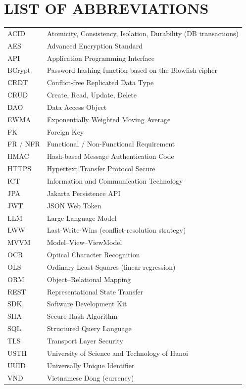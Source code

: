 \documentclass[13pt,a4paper]{extarticle}
\begin{document}
\section*{LIST OF ABBREVIATIONS}
\vspace{0.4cm}
\renewcommand{\arraystretch}{1.25}
\begin{longtable}{@{\hspace{1cm}}p{2.6cm}p{9.5cm}@{}}
ACID     & Atomicity, Consistency, Isolation, Durability (DB transactions) \\
AES      & Advanced Encryption Standard \\
API      & Application Programming Interface \\
BCrypt   & Password-hashing function based on the Blowfish cipher \\
CRDT     & Conflict-free Replicated Data Type \\
CRUD     & Create, Read, Update, Delete \\
DAO      & Data Access Object \\
EWMA     & Exponentially Weighted Moving Average \\
FK       & Foreign Key \\
FR / NFR & Functional / Non-Functional Requirement \\
HMAC     & Hash-based Message Authentication Code \\
HTTPS    & Hypertext Transfer Protocol Secure \\
ICT      & Information and Communication Technology \\
JPA      & Jakarta Persistence API \\
JWT      & JSON Web Token \\
LLM      & Large Language Model \\
LWW      & Last-Write-Wins (conflict-resolution strategy) \\
MVVM     & Model--View--ViewModel \\
OCR      & Optical Character Recognition \\
OLS      & Ordinary Least Squares (linear regression) \\
ORM      & Object--Relational Mapping \\
REST     & Representational State Transfer \\
SDK      & Software Development Kit \\
SHA      & Secure Hash Algorithm \\
SQL      & Structured Query Language \\
TLS      & Transport Layer Security \\
USTH     & University of Science and Technology of Hanoi \\
UUID     & Universally Unique Identifier \\
VND      & Vietnamese Dong (currency) \\
\end{longtable}
\clearpage
\end{document}
